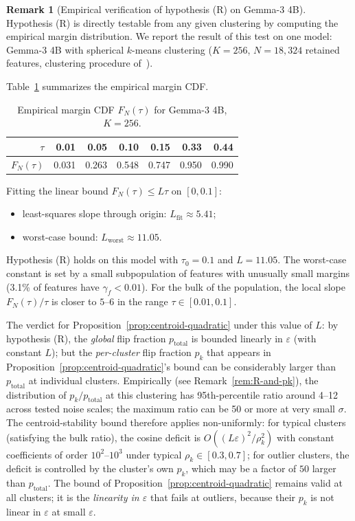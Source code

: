 \documentclass[11pt,letterpaper]{article}
\theoremstyle{definition}
\newtheorem{remark}[theorem]{Remark}
\begin{document}
\begin{remark}[Empirical verification of hypothesis (R) on Gemma-3 4B]
\label{rem:cdf-empirical}
Hypothesis (R) is directly testable from any given clustering by computing the empirical margin distribution. We report the result of this test on one model: Gemma-3 4B with spherical $k$-means clustering ($K = 256$, $N = 18{,}324$ retained features, clustering procedure of~\citep{cluster_size_confound}).

Table~\ref{tab:R-empirical} summarizes the empirical margin CDF.

\begin{table}[h]
\centering
\small
\begin{tabular}{rrrrrrr}
\toprule
$\tau$ & 0.01 & 0.05 & 0.10 & 0.15 & 0.33 & 0.44 \\
\midrule
$F_N(\tau)$ & 0.031 & 0.263 & 0.548 & 0.747 & 0.950 & 0.990 \\
\bottomrule
\end{tabular}
\caption{Empirical margin CDF $F_N(\tau)$ for Gemma-3 4B, $K = 256$.}
\label{tab:R-empirical}
\end{table}

Fitting the linear bound $F_N(\tau) \leq L \tau$ on $[0, 0.1]$:
\begin{itemize}[itemsep=0pt, topsep=2pt]
\item least-squares slope through origin: $L_{\mathrm{fit}} \approx 5.41$;
\item worst-case bound: $L_{\mathrm{worst}} \approx 11.05$.
\end{itemize}
Hypothesis (R) holds on this model with $\tau_0 = 0.1$ and $L = 11.05$. The worst-case constant is set by a small subpopulation of features with unusually small margins (3.1\% of features have $\gamma_f < 0.01$). For the bulk of the population, the local slope $F_N(\tau) / \tau$ is closer to $5$--$6$ in the range $\tau \in [0.01, 0.1]$.

The verdict for Proposition~\ref{prop:centroid-quadratic} under this value of $L$: by hypothesis (R), the \emph{global} flip fraction $p_{\mathrm{total}}$ is bounded linearly in $\varepsilon$ (with constant $L$); but the \emph{per-cluster} flip fraction $p_k$ that appears in Proposition~\ref{prop:centroid-quadratic}'s bound can be considerably larger than $p_{\mathrm{total}}$ at individual clusters. Empirically (see Remark~\ref{rem:R-and-pk}), the distribution of $p_k / p_{\mathrm{total}}$ at this clustering has 95th-percentile ratio around 4--12 across tested noise scales; the maximum ratio can be 50 or more at very small $\sigma$. The centroid-stability bound therefore applies non-uniformly: for typical clusters (satisfying the bulk ratio), the cosine deficit is $O((L \varepsilon)^2 / \rho_k^2)$ with constant coefficients of order $10^2$--$10^3$ under typical $\rho_k \in [0.3, 0.7]$; for outlier clusters, the deficit is controlled by the cluster's own $p_k$, which may be a factor of $50$ larger than $p_{\mathrm{total}}$. The bound of Proposition~\ref{prop:centroid-quadratic} remains valid at all clusters; it is the \emph{linearity in $\varepsilon$} that fails at outliers, because their $p_k$ is not linear in $\varepsilon$ at small $\varepsilon$.


\end{remark}
\end{document}
